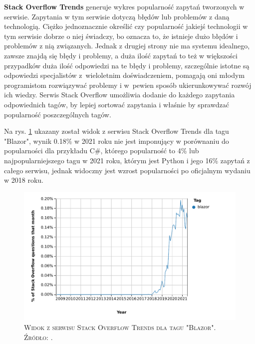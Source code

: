 \documentclass[12pt,a4paper,oneside]{book}
\newcommand{\captionT}[1]{\caption{\textsc{\footnotesize{#1}}}}
\begin{document}
\textbf{Stack Overflow Trends} generuje wykres popularność zapytań tworzonych w serwisie. Zapytania w tym serwisie dotyczą błędów lub problemów z daną technologią. Ciężko jednoznacznie określić czy popularność jakiejś technologii w tym serwisie dobrze o niej świadczy, bo oznacza to, że istnieje dużo błędów i problemów z nią związanych. Jednak z drugiej strony nie ma systemu idealnego, zawsze znajdą się błędy i problemy, a duża ilość zapytań to też w większości przypadków duża ilość odpowiedzi na te błędy i problemy, szczególnie istotne są odpowiedzi specjalistów z~wieloletnim doświadczeniem, pomagają oni młodym programistom rozwiązywać problemy i w~pewien sposób ukierunkowywać rozwój ich wiedzy. Serwis Stack Overflow umożliwia dodanie do każdego zapytania odpowiednich tagów, by lepiej sortować zapytania i właśnie by sprawdzać popularność poszczególnych tagów.

Na rys. \ref{rys_stackoverflow_trends_blazor} ukazany został widok z serwisu Stack Overflow Trends dla tagu "Blazor", wynik 0.18\% w 2021 roku nie jest imponujący w porównaniu do popularności dla przykładu C\#, którego popularność to 4\% lub najpopularniejszego tagu w 2021 roku, którym jest Python i jego 16\% zapytań z całego serwisu, jednak widoczny jest wzrost popularności po oficjalnym wydaniu w 2018 roku.

\begin{figure}[H]
\centering
\includegraphics[width=1\textwidth]{images/StackOverflowBlazor.pdf}
\captionT{Widok z serwisu Stack Overflow Trends dla tagu "Blazor". Źródło: \cite{STACKOVERFLOW_TRENDS_BLAZOR}.}
\label{rys_stackoverflow_trends_blazor}
\end{figure}
\end{document}
